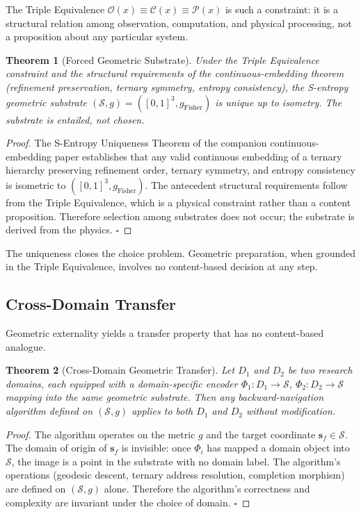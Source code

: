 \documentclass[11pt,twocolumn,a4paper]{article}
\newtheorem{theorem}{Theorem}[section]
\begin{document}
The Triple Equivalence $\mathcal{O}(x) \equiv \mathcal{C}(x) \equiv \mathcal{P}(x)$ is such a constraint: it is a structural relation among observation, computation, and physical processing, not a proposition about any particular system.

\begin{theorem}[Forced Geometric Substrate]
\label{thm:forced_substrate}
Under the Triple Equivalence constraint and the structural requirements of the continuous-embedding theorem (refinement preservation, ternary symmetry, entropy consistency), the S-entropy geometric substrate $(\mathcal{S}, g) = ([0,1]^3, g_{\text{Fisher}})$ is unique up to isometry. The substrate is \emph{entailed}, not chosen.
\end{theorem}

\begin{proof}
The S-Entropy Uniqueness Theorem of the companion continuous-embedding paper establishes that any valid continuous embedding of a ternary hierarchy preserving refinement order, ternary symmetry, and entropy consistency is isometric to $([0,1]^3, g_{\text{Fisher}})$. The antecedent structural requirements follow from the Triple Equivalence, which is a physical constraint rather than a content proposition. Therefore selection among substrates does not occur; the substrate is derived from the physics. $\square$
\end{proof}

The uniqueness closes the choice problem. Geometric preparation, when grounded in the Triple Equivalence, involves no content-based decision at any step.

\subsection{Cross-Domain Transfer}

Geometric externality yields a transfer property that has no content-based analogue.

\begin{theorem}[Cross-Domain Geometric Transfer]
\label{thm:cross_domain}
Let $D_1$ and $D_2$ be two research domains, each equipped with a domain-specific encoder $\Phi_1: D_1 \to \mathcal{S}$, $\Phi_2: D_2 \to \mathcal{S}$ mapping into the same geometric substrate. Then any backward-navigation algorithm defined on $(\mathcal{S}, g)$ applies to both $D_1$ and $D_2$ without modification.
\end{theorem}

\begin{proof}
The algorithm operates on the metric $g$ and the target coordinate $\mathbf{s}_f \in \mathcal{S}$. The domain of origin of $\mathbf{s}_f$ is invisible: once $\Phi_i$ has mapped a domain object into $\mathcal{S}$, the image is a point in the substrate with no domain label. The algorithm's operations (geodesic descent, ternary address resolution, completion morphism) are defined on $(\mathcal{S}, g)$ alone. Therefore the algorithm's correctness and complexity are invariant under the choice of domain. $\square$
\end{proof}
\end{document}
